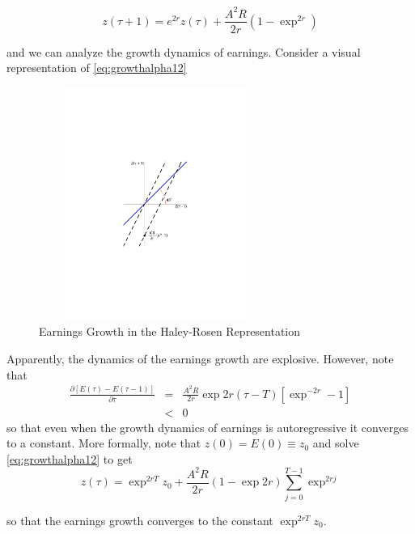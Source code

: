 \begin{equation}
z(\tau + 1) = e^{2r} z(\tau) + \frac{A^2 R}{2r} \left( 1 - \exp^{2r} \right) \label{eq:growthalpha12}
\end{equation}

\noindent and we can analyze the growth dynamics of earnings. Consider a visual representation of \eqref{eq:growthalpha12}

\begin{center}
\begin{figure}[H]
\caption{Earnings Growth in the Haley-Rosen Representation}
\centering
\includegraphics[width=3in, height=3in]{Figures/fig-explode-converge.pdf}
\end{figure}
\end{center}

\indent Apparently, the dynamics of the earnings growth are explosive. However, note that
\begin{eqnarray}
\frac{\partial \left[ E(\tau) - E(\tau - 1) \right] }{\partial \tau} &=& \frac{A^2 R}{2r} \exp{2r(\tau - T)} \left[ \exp^{-2r} - 1 \right] \nonumber \\
&<& 0
\end{eqnarray}
so that even when the growth dynamics of earnings is autoregressive it converges to a constant. More formally, note that $z(0) = E(0) \equiv z_{0}$ and solve \eqref{eq:growthalpha12} to get
\begin{equation}
z(\tau) = \exp^{2rT} z_{0} + \frac{A^2 R}{2r} \left( 1 - \exp{2r} \right) \sum \limits _{j=0} ^{T-1} \exp^{2rj}
\end{equation}

\noindent so that the earnings growth converges to the constant $\exp^{2rT} z_{0}$.\\

